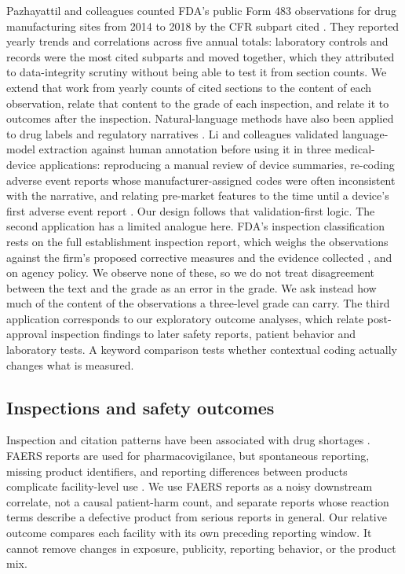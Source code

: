 \documentclass[12pt]{article}
\begin{document}
Pazhayattil and colleagues counted FDA's public Form 483 observations for
drug manufacturing sites from 2014 to 2018 by the CFR subpart cited
\citep{Pazhayattil2020}. They reported yearly trends and correlations
across five annual totals: laboratory controls and records were the most
cited subparts and moved together, which they attributed to data-integrity
scrutiny without being able to test it from section counts. We extend that
work from yearly counts of cited sections to the content of each
observation, relate that content to the grade of each inspection, and
relate it to outcomes after the inspection. Natural-language methods have
also been applied to drug labels and regulatory narratives
\citep{Bayer2021,Wu2021BERT}. Li and
colleagues validated language-model extraction against human annotation
before using it in three medical-device applications: reproducing a manual
review of device summaries, re-coding adverse event reports whose
manufacturer-assigned codes were often inconsistent with the narrative, and
relating pre-market features to the time until a device's first adverse
event report \citep{Li2026LLMDevice}. Our design follows that
validation-first logic. The second application has a limited analogue here.
FDA's inspection classification rests on the full establishment inspection
report, which weighs the observations against the firm's proposed corrective
measures and the evidence collected \citep{Pazhayattil2020}, and on agency
policy. We observe none of these, so
we do not treat disagreement between the text and the grade as an error in
the grade. We ask instead how much of the content of the observations a
three-level grade can carry. The third application corresponds to our
exploratory outcome analyses, which relate post-approval inspection
findings to later safety reports, patient behavior and laboratory tests. A keyword comparison tests whether contextual coding
actually changes what is measured.

\subsection{Inspections and safety outcomes}

Inspection and citation patterns have been associated with drug shortages
\citep{Stomberg2018,Wang2025MSOM}. FAERS reports are used for
pharmacovigilance, but spontaneous reporting, missing product identifiers,
and reporting differences between products complicate facility-level use
\citep{Rahman2017FAERS,Alatawi2018,Potter2025}. We use FAERS reports as a
noisy downstream correlate, not a causal patient-harm count, and separate
reports whose reaction terms describe a defective product from serious
reports in general. Our relative outcome compares each facility with its
own preceding reporting window. It cannot remove changes in exposure,
publicity, reporting behavior, or the product mix.
\end{document}
